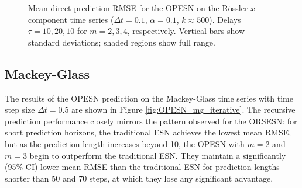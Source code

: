 \begin{figure}

    \centering

    \caption{Mean direct prediction RMSE for the OPESN on the Rössler $x$ component time series ($\Delta t = 0.1$, $\alpha=0.1$, $k\approx500$). Delays $\tau=10,20,10$ for $m=2,3,4$, respectively. Vertical bars show standard deviations; shaded regions show full range.}
    \label{fig:OPESN_rossler_direct}
\end{figure}

\subsection{Mackey-Glass}

The results of the OPESN prediction on the Mackey-Glass time series with time step size $\Delta t=0.5$ are shown in Figure \ref{fig:OPESN_mg_iterative}. The recursive prediction performance closely mirrors the pattern observed for the ORSESN: for short prediction horizons, the traditional ESN achieves the lowest mean RMSE, but as the prediction length increases beyond 10, the OPESN with $m=2$ and $m=3$ begin to outperform the traditional ESN. They maintain a significantly (95\% CI) lower mean RMSE than the traditional ESN for prediction lengths shorter than 50 and 70 steps, at which they lose any significant advantage.

